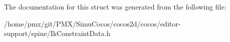 The documentation for this struct was generated from the following file\+:\begin{DoxyCompactItemize}
\item 
/home/pmx/git/\+P\+M\+X/\+Simu\+Cocos/cocos2d/cocos/editor-\/support/spine/Ik\+Constraint\+Data.\+h\end{DoxyCompactItemize}
